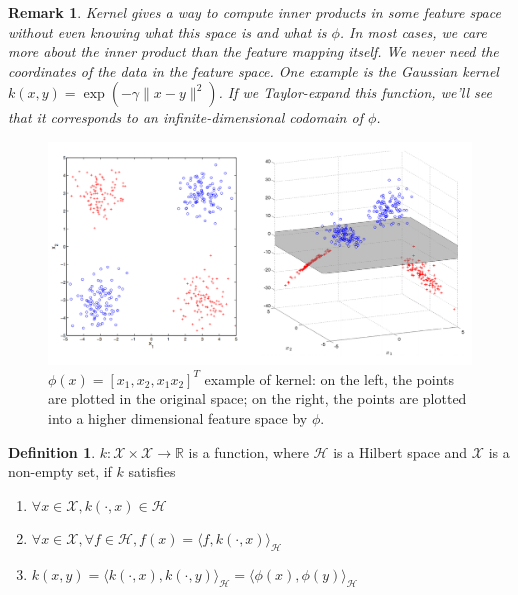 \documentclass[a4paper]{article}
\theoremstyle{definition}
\newtheorem{definition}{Definition}
\theoremstyle{plain}
\newtheorem{remark}{Remark}
\newcounter{example}{Example}
\begin{document}
\begin{remark}
Kernel gives a way to compute inner products in some feature space without even knowing what this space is and what is $\phi$. In most cases, we care more about the inner product than the feature mapping itself. We never need the coordinates of the data in the
feature space. One example is the Gaussian kernel $k(x,y)=\exp(−\gamma\|x−y\|^2)$. If we Taylor-expand this function, we'll see that it corresponds to an infinite-dimensional codomain of $\phi$.
\end{remark}

\begin{figure}[H]
\centering
\includegraphics[scale=0.3]{figure/kernel.png}
\caption{$\phi(x)=[x_1,x_2,x_1x_2]^T$ example of kernel: on the left, the points are plotted in the original space; on the right, the points are plotted into a higher dimensional feature space by $\phi$.}
\end{figure}

\begin{definition}
 $k:\mathcal{X}\times\mathcal{X}\rightarrow\mathbb{R}$ is a function, where $\mathcal{H}$ is a Hilbert space and $\mathcal{X}$ is a non-empty set, if $k$ satisfies
\begin{enumerate}
    \item $\forall x\in \mathcal{X},k(\cdot,x)\in\mathcal{H}$
    \item $\forall x\in\mathcal{X},\forall f\in\mathcal{H},f(x)=\langle f,k(\cdot,x)\rangle_\mathcal{H}$
    \item $k(x,y)=\langle k(\cdot,x),k(\cdot,y)\rangle_\mathcal{H}=\langle \phi(x),\phi(y)\rangle_\mathcal{H}$
\end{enumerate}
\end{definition}
\end{document}
